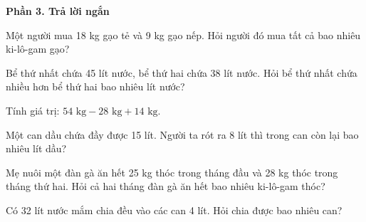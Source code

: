 \textbf{Phần 3. Trả lời ngắn}

\begin{ex} %
Một người mua 18 kg gạo tẻ và 9 kg gạo nếp. Hỏi người đó mua tất cả bao nhiêu ki-lô-gam gạo?
\end{ex}

\begin{ex} %
Bể thứ nhất chứa 45 lít nước, bể thứ hai chứa 38 lít nước. Hỏi bể thứ nhất chứa nhiều hơn bể thứ hai bao nhiêu lít nước?
\end{ex}

\begin{ex} %
Tính giá trị: $54\text{ kg} - 28\text{ kg} + 14\text{ kg}$.
\end{ex}

\begin{ex} %
Một can dầu chứa đầy được 15 lít. Người ta rót ra 8 lít thì trong can còn lại bao nhiêu lít dầu?
\end{ex}

\begin{ex} %
Mẹ nuôi một đàn gà ăn hết 25 kg thóc trong tháng đầu và 28 kg thóc trong tháng thứ hai. Hỏi cả hai tháng đàn gà ăn hết bao nhiêu ki-lô-gam thóc?
\end{ex}

\begin{ex} %
Có 32 lít nước mắm chia đều vào các can 4 lít. Hỏi chia được bao nhiêu can?
\end{ex}
